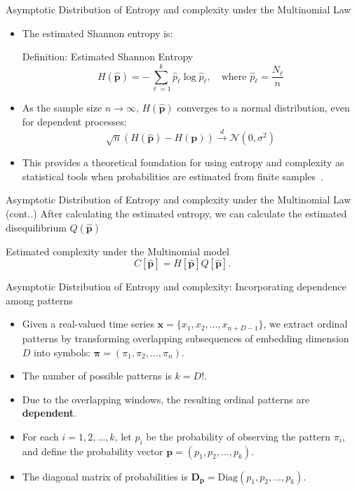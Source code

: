 \documentclass{beamer}
\begin{document}
\begin{frame}{Asymptotic Distribution of Entropy and complexity under the Multinomial Law}
	\begin{itemize}
		\item The estimated Shannon entropy is:
		\begin{block}{Definition: Estimated Shannon Entropy}
			\[
			H(\widehat{\mathbf{p}}) = -\sum_{\ell=1}^k \hat{p}_\ell \log \hat{p}_\ell, \quad \text{where } \hat{p}_\ell = \frac{N_\ell}{n}
			\]
		\end{block}
	
		\item As the sample size $n \rightarrow \infty$, $H(\widehat{\mathbf{p}})$ converges to a normal distribution, even for dependent processes:
		\[
		\sqrt{n}(H(\widehat{\mathbf{p}}) - H(\mathbf{p})) \xrightarrow{d} \mathcal{N}(0, \sigma^2)
		\]
		\item This provides a theoretical foundation for using entropy and complexity as statistical tools when probabilities are estimated from finite samples~\cite{Rey2023}.
	\end{itemize}
\end{frame}


\begin{frame}{Asymptotic Distribution of Entropy and complexity under the Multinomial Law (cont..)}
	After calculating the estimated entropy, we can calculate the estimated disequilibrium $Q(\widehat{\mathbf{p}})$ 
	
	\begin{block}{Estimated complexity under the Multinomial model}
		\[	C[\widehat{\bm{p}}]=H[\widehat{\bm{p}}]Q[\widehat{\bm{p}}].\]
	\end{block}
\end{frame}

\begin{frame}{Asymptotic Distribution of Entropy and complexity: Incorporating dependence among patterns}
	\begin{itemize}
		\item Given a real-valued time series $\mathbf{x} = \{x_1, x_2, \ldots, x_{n+D-1}\}$, we extract ordinal patterns by transforming overlapping subsequences of embedding dimension $D$ into symbols: $\mathbf{\pi} = (\pi_1, \pi_2, \ldots, \pi_n)$.
		\item The number of possible patterns is $k = D!$.
		\item Due to the overlapping windows, the resulting ordinal patterns are \textbf{dependent}.
		\item For each $i = 1, 2, \ldots, k$, let $p_i$ be the probability of observing the pattern $\pi_i$, and define the probability vector $\mathbf{p} = (p_1, p_2, \ldots, p_k)$.
		\item The diagonal matrix of probabilities is $\mathbf{D_p} = \text{Diag}(p_1, p_2, \ldots, p_k)$.
	\end{itemize}
\end{frame}
\end{document}
